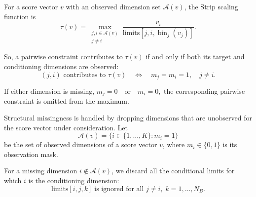 







For a score vector $v$ with an observed dimension set $\mathcal{A}(v)$, the Strip scaling function is
\[
\tau(v) = \max_{\substack{j,i\in\mathcal{A}(v)\\j\neq i}}
\frac{v_i}{\mathrm{limits}[j,i,\operatorname{bin}_j(v_j)]}.
\]

So, a pairwise constraint contributes to $\tau(v)$ if and only if both its target and conditioning dimensions are observed:
\[
(j,i)\text{ contributes to }\tau(v)
\quad\Longleftrightarrow\quad
m_j=m_i=1,\quad j\neq i.
\]

If either dimension is missing, $m_j=0\quad\text{or}\quad m_i=0,$
the corresponding pairwise constraint is omitted from the maximum.

Structural missingness is handled by dropping dimensions that are unobserved for the score vector under consideration. Let
\[
\mathcal{A}(v)=\{i\in\{1,\ldots,K\}:m_i=1\}
\]
be the set of observed dimensions of a score vector $v$, where $m_i\in\{0,1\}$ is its observation mask.

For a missing dimension $i\notin\mathcal{A}(v)$, we discard all the conditional limits for which $i$ is the conditioning dimension:
\[
\text{limits}[i,j,k]\;\text{is ignored for all }j\neq i,\; k=1,\ldots,N_B.
\]

